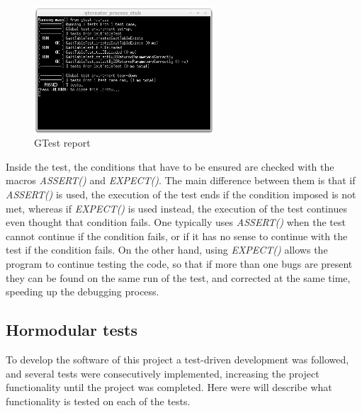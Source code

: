 \begin{figure}[h]
		\centering
        \includegraphics[width=0.6\textwidth]{images/software_gtest_report.png}
        \caption{GTest report}\label{fig:software_gtest_report}
\end{figure}

Inside the test, the conditions that have to be ensured are checked with the macros \emph{ASSERT()} and \emph{EXPECT()}. The main difference between them is that if \emph{ASSERT()} is used, the execution of the test ends if the condition imposed is not met, whereas if \emph{EXPECT()} is used instead, the execution of the test continues even thought that condition fails. One typically uses \emph{ASSERT()} when the test cannot continue if the condition fails, or if it has no sense to continue with the test if the condition fails. On the other hand, using \emph{EXPECT()} allows the program to continue testing the code, so that if more than one bugs are present they can be found on the same run of the test, and corrected at the same time, speeding up the debugging process.\\

\subsection{Hormodular tests}
\label{software_testexplanation}
To develop the software of this project a test-driven development was followed, and several tests were consecutively implemented, increasing the project functionality until the project was completed. Here were will describe what functionality is tested on each of the tests.

